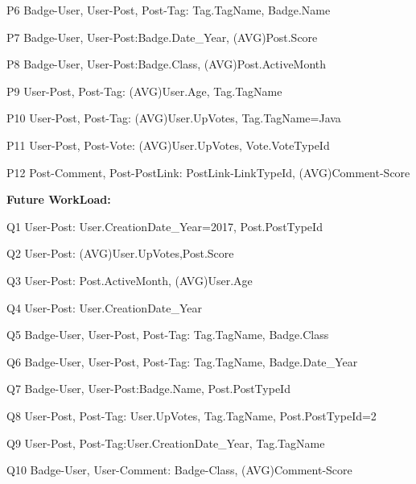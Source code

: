 P6 \hspace{3mm} Badge-User, User-Post, Post-Tag: Tag.TagName, Badge.Name

P7 \hspace{3mm} Badge-User, User-Post:Badge.Date\_Year, (AVG)Post.Score

P8 \hspace{3mm} Badge-User, User-Post:Badge.Class, (AVG)Post.ActiveMonth

P9 \hspace{3mm} User-Post, Post-Tag: (AVG)User.Age, Tag.TagName

P10 \hspace{1.3mm} User-Post, Post-Tag: (AVG)User.UpVotes, Tag.TagName=Java

P11 \hspace{1.3mm} User-Post, Post-Vote: (AVG)User.UpVotes, Vote.VoteTypeId

P12 \hspace{1.3mm} Post-Comment, Post-PostLink: PostLink-LinkTypeId, (AVG)Comment-Score


\par
\textbf{Future WorkLoad:}

Q1 \hspace{3mm} User-Post: User.CreationDate\_Year=2017, Post.PostTypeId

Q2 \hspace{3mm} User-Post: (AVG)User.UpVotes,Post.Score

Q3 \hspace{3mm} User-Post: Post.ActiveMonth, (AVG)User.Age

Q4 \hspace{3mm} User-Post: User.CreationDate\_Year

Q5 \hspace{3mm} Badge-User, User-Post, Post-Tag: Tag.TagName, Badge.Class

Q6 \hspace{3mm} Badge-User, User-Post, Post-Tag: Tag.TagName, Badge.Date\_Year

Q7 \hspace{3mm} Badge-User, User-Post:Badge.Name, Post.PostTypeId

Q8 \hspace{3mm} User-Post, Post-Tag: User.UpVotes, Tag.TagName, Post.PostTypeId=2

Q9 \hspace{3mm} User-Post, Post-Tag:User.CreationDate\_Year, Tag.TagName

Q10 \hspace{1.3mm} Badge-User, User-Comment: Badge-Class, (AVG)Comment-Score

